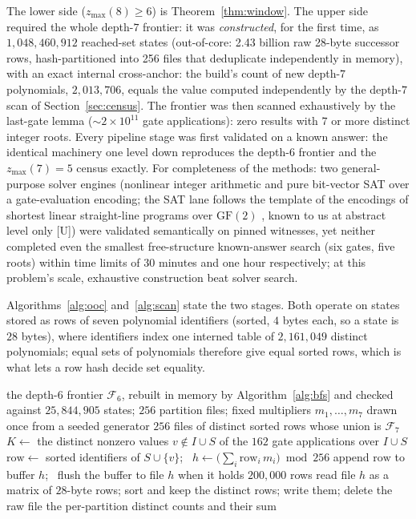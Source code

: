 \documentclass[11pt]{article}
\theoremstyle{definition}
\theoremstyle{remark}
\newcommand{\zmax}{z_{\max}}
\begin{document}
The lower side ($\zmax(8) \ge 6$) is Theorem~\ref{thm:window}. The upper side
required the whole depth-$7$ frontier: it was \emph{constructed}, for the first time,
as $1{,}048{,}460{,}912$ reached-set states (out-of-core: 2.43 billion raw
28-byte successor rows, hash-partitioned into 256 files that deduplicate
independently in memory), with an exact internal cross-anchor: the
build's count of new depth-$7$ polynomials, $2{,}013{,}706$, equals the value
computed independently by the depth-$7$ scan of Section~\ref{sec:census}. The
frontier was then scanned exhaustively by the last-gate lemma
($\sim\!2 \times 10^{11}$ gate applications): zero
results with $7$ or more distinct integer roots. Every pipeline stage was first
validated on a known answer: the identical machinery one level down reproduces the
depth-$6$ frontier and the $\zmax(7) = 5$ census exactly. For completeness of the
methods: two general-purpose solver engines (nonlinear
integer arithmetic and pure bit-vector SAT over a gate-evaluation encoding; the SAT lane
follows the template of the encodings of shortest linear straight-line programs over
$\mathrm{GF}(2)$ \cite{FuhsSchneiderKamp2010}, known to us at abstract level only [U])
were validated semantically on pinned witnesses, yet neither completed even
the smallest free-structure known-answer search (six gates, five roots) within
time limits of $30$ minutes and one hour respectively; at this problem's scale,
exhaustive construction beat solver search.

Algorithms~\ref{alg:ooc} and~\ref{alg:scan} state the two stages. Both operate on states
stored as rows of seven polynomial identifiers (sorted, $4$ bytes each, so a state is
$28$ bytes), where identifiers index one interned table of $2{,}161{,}049$ distinct
polynomials; equal sets of polynomials therefore give equal sorted rows, which is what lets
a row hash decide set equality.

\begin{algorithm}[t]
\caption{Out-of-core construction of the depth-$7$ frontier by hash-partitioned deduplication.}
\label{alg:ooc}
\begin{algorithmic}[1]
\Require the depth-$6$ frontier $\mathcal{F}_6$, rebuilt in memory by Algorithm~\ref{alg:bfs} and checked against $25{,}844{,}905$ states; $256$ partition files; fixed multipliers $m_1, \dots, m_7$ drawn once from a seeded generator
\Ensure $256$ files of distinct sorted rows whose union is $\mathcal{F}_7$
 
  \State $K \gets$ the distinct nonzero values $v \notin I \cup S$ of the $162$ gate applications over $I \cup S$
    \State $\mathrm{row} \gets$ sorted identifiers of $S \cup \{v\}$; \ $h \gets \bigl(\sum_i \mathrm{row}_i\, m_i\bigr) \bmod 256$
    \State append $\mathrm{row}$ to buffer $h$; \ flush the buffer to file $h$ when it holds $200{,}000$ rows
  \EndFor
\EndFor
{} 
  \State read file $h$ as a matrix of $28$-byte rows; sort and keep the distinct rows; write them; delete the raw file
\EndFor
\State \Return the per-partition distinct counts and their sum
\end{algorithmic}
\end{algorithm}
\end{document}
